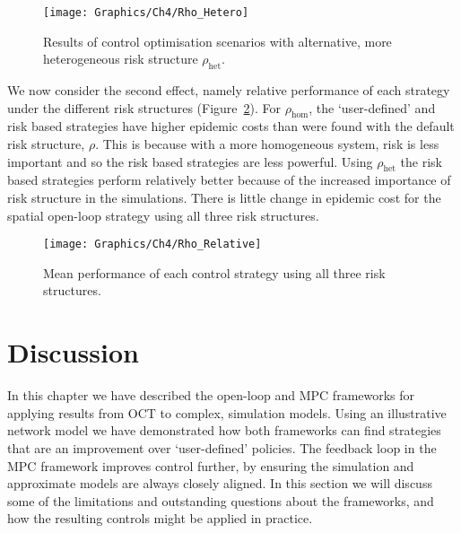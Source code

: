 \begin{figure}
    \begin{center}
        \texttt{[image: Graphics/Ch4/Rho\_Hetero]}
        \caption[Control strategy performance with more heterogeneous risk structure]{Results of control optimisation scenarios with alternative, more heterogeneous risk structure $\rho_{\mathrm{het}}$.}
        \label{fig:ch4:rho_hetero}
    \end{center}
\end{figure}

We now consider the second effect, namely relative performance of each strategy under the different risk structures (Figure~\ref{fig:ch4:rho_relative}). For $\rho_{\mathrm{hom}}$, the `user-defined' and risk based strategies have higher epidemic costs than were found with the default risk structure, $\rho$. This is because with a more homogeneous system, risk is less important and so the risk based strategies are less powerful. Using $\rho_{\mathrm{het}}$ the risk based strategies perform relatively better because of the increased importance of risk structure in the simulations. There is little change in epidemic cost for the spatial open-loop strategy using all three risk structures.

\begin{figure}
    \begin{center}
        \texttt{[image: Graphics/Ch4/Rho\_Relative]}
        \caption[Comparing control performance across risk structures]{Mean performance of each control strategy using all three risk structures.}
        \label{fig:ch4:rho_relative}
    \end{center}
\end{figure}

\FloatBarrier

\section{Discussion}\label{sec:ch4:Discussion}

In this chapter we have described the open-loop and MPC frameworks for applying results from OCT to complex, simulation models. Using an illustrative network model we have demonstrated how both frameworks can find strategies that are an improvement over `user-defined' policies. The feedback loop in the MPC framework improves control further, by ensuring the simulation and approximate models are always closely aligned. In this section we will discuss some of the limitations and outstanding questions about the frameworks, and how the resulting controls might be applied in practice.

